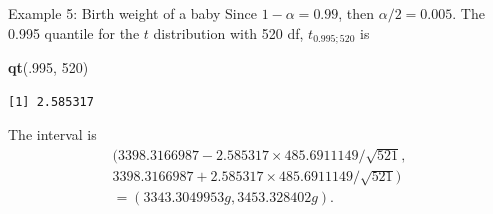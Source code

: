 \documentclass[
  ignorenonframetext,
]{beamer}
\newenvironment{Shaded}{\begin{snugshade}}{\end{snugshade}}
\newcommand{\DecValTok}[1]{\textcolor[rgb]{0.00,0.00,0.81}{#1}}
\newcommand{\FunctionTok}[1]{\textcolor[rgb]{0.13,0.29,0.53}{\textbf{#1}}}
\newcommand{\NormalTok}[1]{#1}
\begin{document}
\begin{frame}[fragile]{Example 5: Birth weight of a baby}
\protect\hypertarget{example-5-birth-weight-of-a-baby-4}{}
Since \(1-\alpha=0.99\), then \(\alpha/2=0.005\). The 0.995 quantile for
the \(t\) distribution with 520 df, \(t_{0.995;520}\) is

\tiny

\begin{Shaded}
\begin{Highlighting}[]
\FunctionTok{qt}\NormalTok{(.}\DecValTok{995}\NormalTok{, }\DecValTok{520}\NormalTok{)}
\end{Highlighting}
\end{Shaded}

\begin{verbatim}
[1] 2.585317
\end{verbatim}

\normalsize

The interval is \[\begin{array}{ll}
(3398.3166987-2.585317\times 485.6911149/\sqrt{521},\\
3398.3166987+2.585317\times 485.6911149/\sqrt{521})\\
=(3343.3049953g, 3453.328402g).
\end{array}\]
\end{frame}
\end{document}
